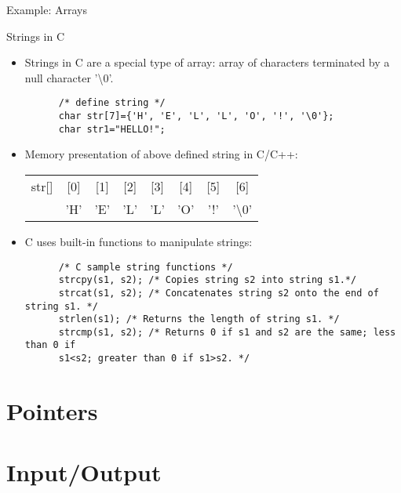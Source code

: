 \documentclass[10pt,t]{beamer}
\begin{document}
\begin{frame}[fragile]{Example: Arrays}
  
\end{frame}

\begin{frame}{Strings in C}
  \begin{itemize}
  \item Strings in C are a special type of array: array of characters terminated by a null character '\textbackslash{}0'.

    \begin{lstlisting}
      /* define string */
      char str[7]={'H', 'E', 'L', 'L', 'O', '!', '\0'};
      char str1="HELLO!";
    \end{lstlisting}

  \item Memory presentation of above defined string in C/C++:

    \begin{tabular}{|c|c|c|c|c|c|c|c|}
      \hline
      str[] & [0] & [1] & [2] & [3] & [4] & [5] & [6] \\
      \cline{2-8}
      & 'H' & 'E' & 'L' & 'L' & 'O' & '!' & '\textbackslash{}0' \\
     \hline
    \end{tabular}

  \item C uses built-in functions to manipulate strings:
    \begin{lstlisting}
      /* C sample string functions */
      strcpy(s1, s2); /* Copies string s2 into string s1.*/
      strcat(s1, s2); /* Concatenates string s2 onto the end of string s1. */
      strlen(s1); /* Returns the length of string s1. */
      strcmp(s1, s2); /* Returns 0 if s1 and s2 are the same; less than 0 if
      s1<s2; greater than 0 if s1>s2. */
    \end{lstlisting}
  \end{itemize}

  
\end{frame}

\section{Pointers}
\section{Input/Output}
\end{document}
